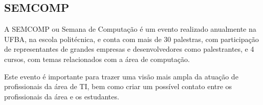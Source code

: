         
    \subsection{SEMCOMP}
        \par A SEMCOMP ou Semana de Computação é um evento realizado anualmente na UFBA, na escola politécnica, e conta com mais de 30 palestras, com participação de representantes de grandes empresas e desenvolvedores como palestrantes, e 4 cursos, com temas relacionados com a área de computação. \par Este evento é importante para trazer uma visão mais ampla da atuação de profissionais da área de TI, bem como criar um possível contato entre os profissionais da área e os estudantes.
